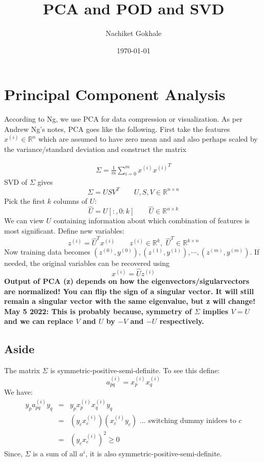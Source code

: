 \documentclass{article}
\newcommand{\beq}{\begin{equation}}
\newcommand{\eeq}{\end{equation}}
\newcommand{\ber}{\begin{eqnarray}}
\newcommand{\eer}{\end{eqnarray}}
\begin{document}
\title{PCA and POD and SVD}
\author{Nachiket Gokhale}
\date{\today}
\maketitle
\section{Principal Component Analysis}
According to Ng, we use PCA for data compression or visualization. As per Andrew Ng's notes, PCA goes like the following. First take the features $x^{(i)} \in \mathbb{R}^n$ which are assumed to have zero mean and and also perhaps scaled by the variance/standard deviation and construct the matrix

\ber
\label{eqn:discretexxt}
\Sigma = \frac{1}{m}\sum_{i=0}^{m}x^{(i)}{x^{(i)}}^{T}
\eer
%
SVD of $\Sigma$ gives
\beq
\Sigma = USV^{T} \qquad U,S,V \in \mathbb{R}^{n\times{n}}
\eeq
Pick the first $k$ columns of $U$:
\beq
\hat{U} = U[:,0:k]  \qquad \hat{U} \in \mathbb{R}^{n\times{k}}
\eeq
We can view $U$ containing information about which combination of features is most significant.
Define new variables:
\beq
\label{eqn:ngproj}
z^{(i)}   = {\hat{U}}^{T}x^{(i)} \qquad z^{(i)} \in \mathbb{R}^{k},\,\, {\hat{U}}^{T} \in \mathbb{R}^{k\times{n}}
\eeq
Now training data becomes $(z^{(0)},y^{(0)}), (z^{(1)},y^{(1)}), \cdots, (z^{(m)},y^{(m)})$. If needed, the original variables can be recovered using
\beq
x^{(i)} = \hat{U}z^{(i)}
\eeq
\textbf{Output of PCA (z) depends on how the eigenvectors/sigularvectors are normalized! You can flip the sign of a singular vector. It will still remain a singular vector with the same eigenvalue, but z will change! May 5 2022: This is probably because, symmetry of $\Sigma$ implies $V=U$ and we can replace $V$ and $U$ by $-V$ and $-U$ respectively.} 
%
%
%
\subsection{Aside} 
The matrix $\Sigma$ is symmetric-positive-semi-definite. To see this define:
\beq
a_{pq}^{(i)} = x^{(i)}_{p}{x^{(i)}_{q}}
\eeq
We have:
\ber
y_{p}a_{pq}^{(i)}y_{q} &=& y_{p}x^{(i)}_{p}{x^{(i)}_{q}}y_{q}  \\
&=& (y_{c}x^{(i)}_{c})({x^{(i)}_{c}}y_{c}) \text{ ... switching dummy inidces to }c\\
&=& (y_{c}x^{(i)}_{c})^2 \ge 0
\eer
Since, $\Sigma$ is a sum of all $a^{i}$, it is also symmetric-positive-semi-definite.
\end{document}
